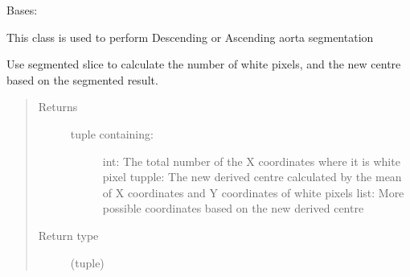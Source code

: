 \documentclass[letterpaper,10pt,english]{sphinxmanual}
\begin{document}
\begin{fulllineitems}
\label{\detokenize{AortaGeomReconDisplayModuleLib:AortaSegmenter.AortaSegmenter}}
\sphinxAtStartPar
Bases: 

\sphinxAtStartPar
This class is used to perform
Descending or Ascending aorta segmentation

\begin{fulllineitems}
\label{\detokenize{AortaGeomReconDisplayModuleLib:AortaSegmenter.AortaSegmenter.__count_pixel_asc}}
\sphinxAtStartPar
Use segmented slice to calculate the number of white pixels,
and the new centre based on the segmented result.
\begin{quote}\begin{description}
\item[{Returns}] \leavevmode
\sphinxAtStartPar
\begin{description}
\item[{tuple containing:}] \leavevmode
\sphinxAtStartPar
int: The total number of the X coordinates where it is white pixel
tupple: The new derived centre calculated by the mean of X coordinates and Y coordinates of white pixels
list: More possible coordinates based on the new derived centre

\end{description}


\item[{Return type}] \leavevmode
\sphinxAtStartPar
(tuple)

\end{description}\end{quote}

\end{fulllineitems}


\end{fulllineitems}
\end{document}
